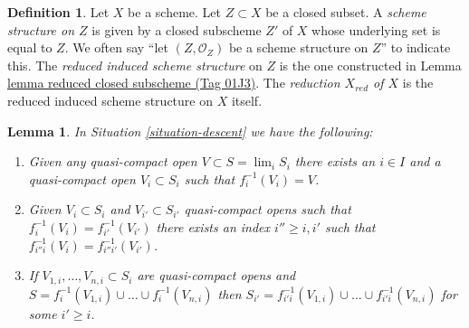 \documentclass{amsart}
\theoremstyle{plain}
\newtheorem{lemma}[subsection]{Lemma}
\theoremstyle{definition}
\newtheorem{definition}[subsection]{Definition}
\theoremstyle{remark}
\numberwithin{equation}{subsection}
\def\lim{\mathop{\mathrm{lim}}\nolimits}
\begin{document}
\begin{definition}
\label{schemes-definition-reduced-induced-scheme}
Let $X$ be a scheme. Let $Z \subset X$ be a closed subset.
A {\it scheme structure on $Z$} is given by a closed subscheme $Z'$ of
$X$ whose underlying set is equal to $Z$. We often say
``let $(Z, \mathcal{O}_Z)$ be a scheme structure on $Z$'' to
indicate this. The {\it reduced induced scheme structure}
on $Z$ is the one constructed in Lemma \href{https://stacks.math.columbia.edu/tag/01J3}{lemma reduced closed subscheme (Tag 01J3)}.
The {\it reduction $X_{red}$ of $X$} is the reduced induced scheme
structure on $X$ itself.
\end{definition}

\begin{lemma}
\label{lemma-descend-opens}
In Situation \ref{situation-descent} we have the following:
\begin{enumerate}
\item Given any quasi-compact open $V \subset S = \lim_i S_i$
there exists an $i \in I$ and a quasi-compact open $V_i \subset S_i$
such that $f_i^{-1}(V_i) = V$.
\item Given $V_i \subset S_i$ and $V_{i'} \subset S_{i'}$
quasi-compact opens such that $f_i^{-1}(V_i) = f_{i'}^{-1}(V_{i'})$
there exists an index $i'' \geq i, i'$ such that
$f_{i''i}^{-1}(V_i) = f_{i''i'}^{-1}(V_{i'})$.
\item If $V_{1, i}, \ldots, V_{n, i} \subset S_i$ are quasi-compact
opens and $S = f_i^{-1}(V_{1, i}) \cup \ldots \cup f_i^{-1}(V_{n, i})$
then $S_{i'} = f_{i'i}^{-1}(V_{1, i}) \cup \ldots \cup f_{i'i}^{-1}(V_{n, i})$
for some $i' \geq i$.
\end{enumerate}
\end{lemma}
\end{document}

